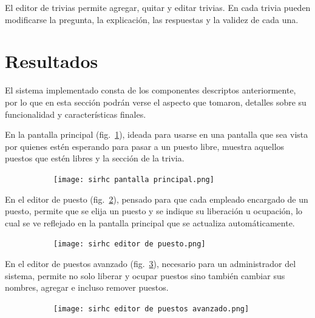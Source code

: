 \documentclass{article}
\begin{document}
El editor de trivias permite agregar, quitar y editar trivias. En cada trivia pueden modificarse la pregunta, la explicación, las respuestas y la validez de cada una.
\newpage
\section{Resultados}
El sistema implementado consta de los componentes descriptos anteriormente, por lo que en esta sección podrán verse el aspecto que tomaron, detalles sobre su funcionalidad y características finales.

En la pantalla principal (fig.~\ref{fig:pantallaPrincipal}), ideada para usarse en una pantalla que sea vista por quienes estén esperando para pasar a un puesto libre, muestra aquellos puestos que estén libres y la sección de la trivia.
\begin{figure}[H]
	\caption{Pantalla principal del sistema}
    \begin{subfigure}{1\textwidth}
	\texttt{[image: sirhc pantalla principal.png]}
    \end{subfigure}
	\label{fig:pantallaPrincipal}
\end{figure}
\vspace{-1.0\baselineskip}
En el editor de puesto (fig.~\ref{fig:editorPuesto}), pensado para que cada empleado encargado de un puesto, permite que se elija un puesto y se indique su liberación u ocupación, lo cual se ve reflejado en la pantalla principal que se actualiza automáticamente.
\begin{figure}[H]
	\caption{Editor de puesto}
    \begin{subfigure}{1\textwidth}
	\texttt{[image: sirhc editor de puesto.png]}
    \end{subfigure}
	\label{fig:editorPuesto}
\end{figure}
\vspace{-1.0\baselineskip}
En el editor de puestos avanzado (fig.~\ref{fig:editorPuestosAvanzado}), necesario para un administrador del sistema, permite no solo liberar y ocupar puestos sino también cambiar sus nombres, agregar e incluso remover puestos.
\begin{figure}[H]
	\caption{Editor de puestos avanzado}
    \begin{subfigure}{1\textwidth}
	\texttt{[image: sirhc editor de puestos avanzado.png]}
    \end{subfigure}
	\label{fig:editorPuestosAvanzado}
\end{figure}
\vspace{-1.0\baselineskip}
\end{document}
